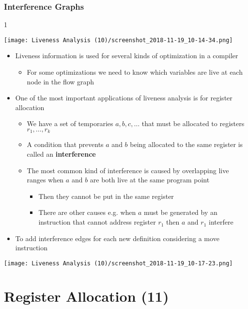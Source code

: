 \documentclass[11pt]{article}
\begin{document}
\subsubsection{Interference Graphs}
\label{sec:org4be51b7}
1\begin{center}
\texttt{[image: Liveness Analysis (10)/screenshot\_2018-11-19\_10-14-34.png]}
\end{center}

\begin{itemize}
\item Liveness information is used for several kinds of optimization in a compiler
\begin{itemize}
\item For some optimizations we need to know which variables are live at each node in the flow graph
\end{itemize}

\item One of the most important applications of liveness analysis is for register allocation
\begin{itemize}
\item We have a set of temporaries \(a,b,c,\dots\) that must be allocated to registers \(r_1,\dots,r_k\)
\item A condition that prevents \(a\) and \(b\) being allocated to the same register is called an \textbf{interference}
\item The most common kind of interference is caused by overlapping live ranges when \(a\) and \(b\) are both live at the same program point
\begin{itemize}
\item Then they cannot be put in the same register
\item There are other causes e.g. when \(a\) must be generated by an instruction that cannot address register \(r_1\) then \(a\) and \(r_1\) interfere
\end{itemize}
\end{itemize}

\item To add interference edges for each new definition considering a move instruction
\end{itemize}
\begin{center}
\texttt{[image: Liveness Analysis (10)/screenshot\_2018-11-19\_10-17-23.png]}
\end{center}

\section{Register Allocation (11)}
\label{sec:orge6055d2}
\end{document}
